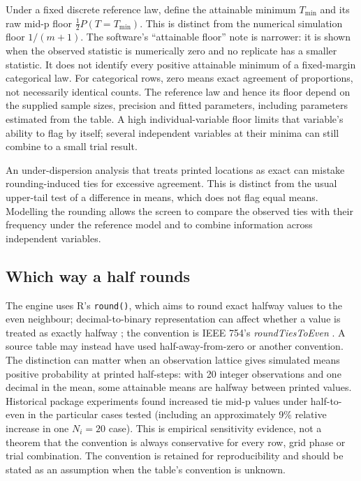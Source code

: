 \documentclass[11pt,a4paper]{article}
\newcommand{\R}{\textsf{R}}
\begin{document}
Under a fixed discrete reference law, define the attainable minimum $T_{\min}$ and its raw mid-p floor $\tfrac12 P(T=T_{\min})$. This is distinct from the numerical simulation floor $1/(m+1)$. The software's ``attainable floor'' note is narrower: it is shown when the observed statistic is numerically zero and no replicate has a smaller statistic. It does not identify every positive attainable minimum of a fixed-margin categorical law. For categorical rows, zero means exact agreement of proportions, not necessarily identical counts. The reference law and hence its floor depend on the supplied sample sizes, precision and fitted parameters, including parameters estimated from the table. A high individual-variable floor limits that variable's ability to flag by itself; several independent variables at their minima can still combine to a small trial result.

An under-dispersion analysis that treats printed locations as exact can mistake rounding-induced ties for excessive agreement. This is distinct from the usual upper-tail test of a difference in means, which does not flag equal means. Modelling the rounding allows the screen to compare the observed ties with their frequency under the reference model and to combine information across independent variables.

\subsection{Which way a half rounds}

The engine uses \R's \texttt{round()}, which aims to round exact halfway values to the even neighbour; decimal-to-binary representation can affect whether a value is treated as exactly halfway \citep{rround}; the convention is IEEE 754's \emph{roundTiesToEven} \citep{ieee754}. A source table may instead have used half-away-from-zero or another convention. The distinction can matter when an observation lattice gives simulated means positive probability at printed half-steps: with 20 integer observations and one decimal in the mean, some attainable means are halfway between printed values. Historical package experiments found increased tie mid-p values under half-to-even in the particular cases tested (including an approximately 9\% relative increase in one $N_i=20$ case). This is empirical sensitivity evidence, not a theorem that the convention is always conservative for every row, grid phase or trial combination. The convention is retained for reproducibility and should be stated as an assumption when the table's convention is unknown.
\end{document}
